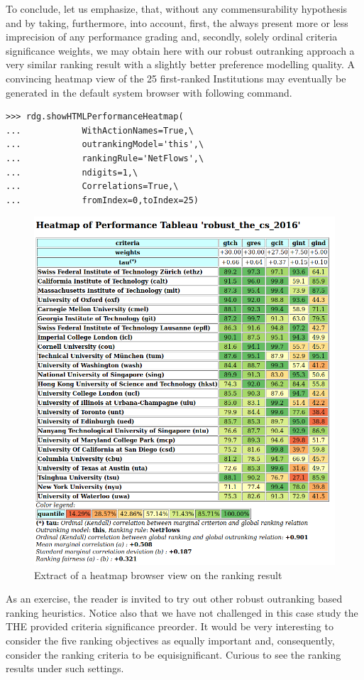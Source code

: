 To conclude, let us emphasize, that, without any commensurability hypothesis and by taking, furthermore, into account, first, the always present more or less imprecision of any performance grading and, secondly, solely ordinal criteria significance weights, we may obtain here with our robust outranking approach a very similar ranking result with a slightly better preference modelling quality. A convincing heatmap view of the 25 first-ranked Institutions may eventually be generated in the default system browser with following command.
\begin{lstlisting}
>>> rdg.showHTMLPerformanceHeatmap(
...            WithActionNames=True,\
...            outrankingModel='this',\
...            rankingRule='NetFlows',\
...            ndigits=1,\
...            Correlations=True,\
...            fromIndex=0,toIndex=25)
\end{lstlisting}
\begin{figure}[ht]
\includegraphics[width=\hsize]{Figures/13-4-theHeatmap.png}
\caption{Extract of a heatmap browser view on the \NetFlows ranking result}
\label{fig:13.4}       %
\end{figure}

As an exercise, the reader is invited to try out other robust outranking based ranking heuristics. Notice also that we have not challenged in this case study the THE provided criteria significance preorder. It would be very interesting to consider the five ranking objectives as equally important and, consequently, consider the ranking criteria to be equisignificant. Curious to see the ranking results under such settings.
 
\clearpage


%